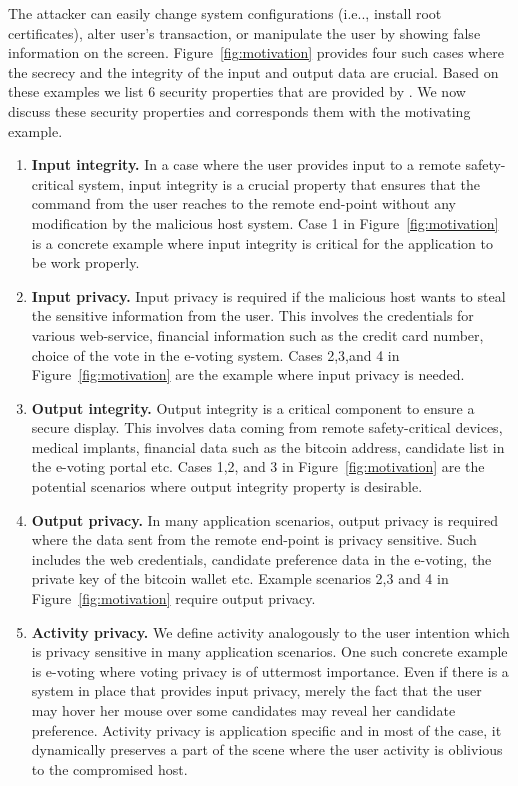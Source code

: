 The attacker can easily change system configurations (i.e.., install root certificates), alter user's transaction, or manipulate the user by showing false information on the screen. Figure~\ref{fig:motivation} provides four such cases where the secrecy and the integrity of the input and output data are crucial. Based on these examples we list 6 security properties that are provided by \name. We now discuss these security properties and corresponds them with the motivating example.

\begin{enumerate}
  \item \textbf{Input integrity.} In a case where the user provides input to a remote safety-critical system, input integrity is a crucial property that ensures that the command from the user reaches to the remote end-point without any modification by the malicious host system. Case 1 in Figure~\ref{fig:motivation} is a concrete example where input integrity is critical for the application to be work properly.
  \item \textbf{Input privacy.}  Input privacy is required if the malicious host wants to steal the sensitive information from the user. This involves the credentials for various web-service, financial information such as the credit card number, choice of the vote in the e-voting system. Cases 2,3,and 4 in Figure~\ref{fig:motivation} are the example where input privacy is needed.
  \item \textbf{Output integrity.} Output integrity is a critical component to ensure a secure display. This involves data coming from remote safety-critical devices, medical implants, financial data such as the bitcoin address, candidate list in the e-voting portal etc. Cases 1,2, and 3 in Figure~\ref{fig:motivation} are the potential scenarios where output integrity property is desirable.
  \item \textbf{Output privacy.} In many application scenarios, output privacy is required where the data sent from the remote end-point is privacy sensitive. Such includes the web credentials, candidate preference data in the e-voting, the private key of the bitcoin wallet etc. Example scenarios 2,3 and 4 in Figure~\ref{fig:motivation} require output privacy.
  \item \textbf{Activity privacy.} We define activity analogously to the user intention which is privacy sensitive in many application scenarios. One such concrete example is e-voting where voting privacy is of uttermost importance. Even if there is a system in place that provides input privacy, merely the fact that the user may hover her mouse over some candidates may reveal her candidate preference. Activity privacy is application specific and in most of the case, it dynamically preserves a part of the scene where the user activity is oblivious to the compromised host. 
\end{enumerate}


